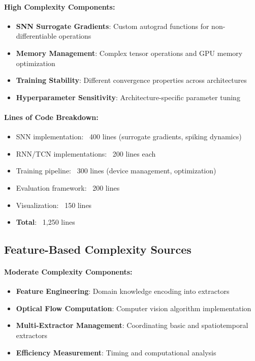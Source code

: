 \documentclass[11pt,a4paper]{article}
\begin{document}
\paragraph{High Complexity Components:}
\begin{itemize}
    \item \textbf{SNN Surrogate Gradients}: Custom autograd functions for non-differentiable operations
    \item \textbf{Memory Management}: Complex tensor operations and GPU memory optimization
    \item \textbf{Training Stability}: Different convergence properties across architectures
    \item \textbf{Hyperparameter Sensitivity}: Architecture-specific parameter tuning
\end{itemize}

\paragraph{Lines of Code Breakdown:}
\begin{itemize}
    \item SNN implementation: ~400 lines (surrogate gradients, spiking dynamics)
    \item RNN/TCN implementations: ~200 lines each
    \item Training pipeline: ~300 lines (device management, optimization)
    \item Evaluation framework: ~200 lines
    \item Visualization: ~150 lines
    \item \textbf{Total}: ~1,250 lines
\end{itemize}

\subsection{Feature-Based Complexity Sources}

\paragraph{Moderate Complexity Components:}
\begin{itemize}
    \item \textbf{Feature Engineering}: Domain knowledge encoding into extractors
    \item \textbf{Optical Flow Computation}: Computer vision algorithm implementation
    \item \textbf{Multi-Extractor Management}: Coordinating basic and spatiotemporal extractors
    \item \textbf{Efficiency Measurement}: Timing and computational analysis
\end{itemize}
\end{document}
